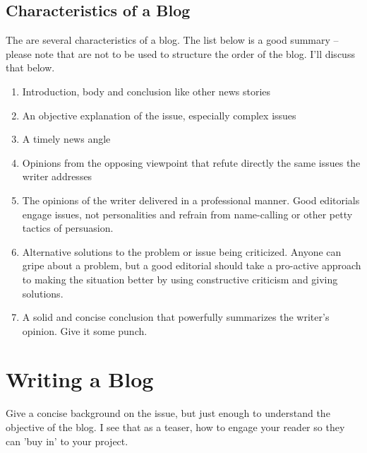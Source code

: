 \documentclass{tufte-handout}\usepackage[]{graphicx}\usepackage[]{color}
\begin{document}
\subsection{Characteristics of a Blog}

The are several characteristics of a blog. The list below is a good summary -- please note that are not to be used to structure the order of the blog. I'll discuss that below. 

\begin{enumerate}
	\item Introduction, body and conclusion like other news stories
	\item An objective explanation of the issue, especially complex issues
	\item A timely news angle
	\item Opinions from the opposing viewpoint that refute directly the same issues the writer addresses
	\item The opinions of the writer delivered in a professional manner. Good editorials engage issues, not personalities and refrain from name-calling or other petty tactics of persuasion.
	\item Alternative solutions to the problem or issue being criticized. Anyone can gripe about a problem, but a good editorial should take a pro-active approach to making the situation better by using constructive criticism and giving solutions.
	\item A solid and concise conclusion that powerfully summarizes the writer's opinion. Give it some punch.
\end{enumerate}



 

\section{Writing a Blog}

Give a concise background on the issue, but just enough to understand the objective of the blog. I see that as a teaser, how to engage your reader so they can 'buy in' to your project.
\end{document}
